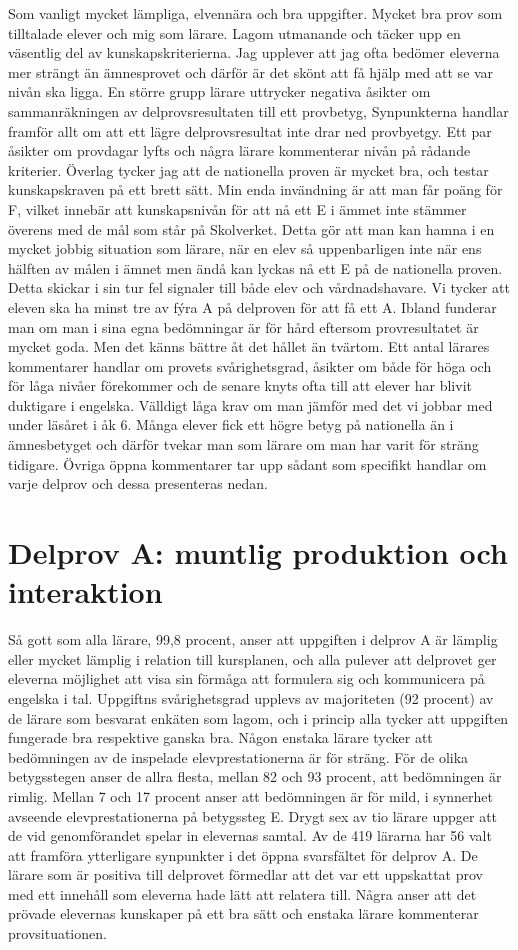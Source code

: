 Som vanligt mycket lämpliga, elvennära och bra uppgifter.
Mycket bra prov som tilltalade elever och mig som lärare. Lagom utmanande och täcker upp en väsentlig del av kunskapskriterierna.
Jag upplever att jag ofta bedömer eleverna mer strängt än ämnesprovet och därför är det skönt att få hjälp med att se var nivån ska ligga.
En större grupp lärare uttrycker negativa åsikter om sammanräkningen av delprovsresultaten till ett provbetyg, Synpunkterna handlar framför allt om att ett lägre delprovsresultat inte drar ned provbyetgy. Ett par åsikter om provdagar lyfts och några lärare kommenterar nivån på rådande kriterier.
Överlag tycker jag att de nationella proven är mycket bra, och testar kunskapskraven på ett brett sätt. Min enda invändning är att man får poäng för F, vilket innebär att kunskapsnivån för att nå ett E i ämmet inte stämmer överens med de mål som står på Skolverket. Detta gör att man kan hamna i en mycket jobbig situation som lärare, när en elev så uppenbarligen inte när ens hälften av målen i ämnet men ändå kan lyckas nå ett E på de nationella proven. Detta skickar i sin tur fel signaler till både elev och vårdnadshavare.
Vi tycker att eleven ska ha minst tre av fýra A på delproven för att få ett A.
Ibland funderar man om man i sina egna bedömningar är för hård eftersom provresultatet är mycket goda. Men det känns bättre åt det hållet än tvärtom.
Ett antal lärares kommentarer handlar om provets svårighetsgrad, åsikter om både för höga och för låga nivåer förekommer och de senare knyts ofta till att elever har blivit duktigare i engelska.
Välldigt låga krav om man jämför med det vi jobbar med under läsåret i åk 6.
Många elever fick ett högre betyg på nationella än i ämnesbetyget och därför tvekar man som lärare om man har varit för sträng tidigare.
Övriga öppna kommentarer tar upp sådant som specifikt handlar om varje delprov och dessa presenteras nedan.
\section*{Delprov A: muntlig produktion och interaktion}
Så gott som alla lärare, 99,8 procent, anser att uppgiften i delprov A är lämplig eller mycket lämplig i relation till kursplanen, och alla pulever att delprovet ger eleverna möjlighet att visa sin förmåga att formulera sig och kommunicera på engelska i tal. Uppgiftns svårighetsgrad upplevs av majoriteten (92 procent) av de lärare som besvarat enkäten som lagom, och i princip alla tycker att uppgiften fungerade bra respektive ganska bra. Någon enstaka lärare tycker att bedömningen av de inspelade elevprestationerna är för sträng. För de olika betygsstegen anser de allra flesta, mellan 82 och 93 procent, att bedömningen är rimlig. Mellan 7 och 17 procent anser att bedömningen är för mild, i synnerhet avseende elevprestationerna på betygssteg E. Drygt sex av tio lärare uppger att de vid genomförandet spelar in elevernas samtal.
Av de 419 lärarna har 56 valt att framföra ytterligare synpunkter i det öppna svarsfältet för delprov A. De lärare som är positiva till delprovet förmedlar att det var ett uppskattat prov med ett innehåll som eleverna hade lätt att relatera till. Några anser att det prövade elevernas kunskaper på ett bra sätt och enstaka lärare kommenterar provsituationen.

